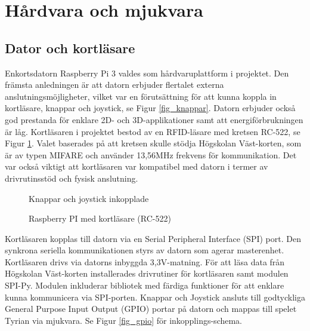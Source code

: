 \documentclass[12pt,fleqn,openany]{book} %
\begin{document}
\section{Hårdvara och mjukvara}
\subsection{Dator och kortläsare}
Enkortsdatorn Raspberry Pi 3 valdes som hårdvaruplattform i projektet. Den främsta anledningen är att datorn erbjuder flertalet
externa anslutningsmöjligheter, vilket var en förutsättning för att kunna koppla in kortläsare, knappar och joystick, se Figur \ref{fig_knappar}. Datorn 
erbjuder också god prestanda för enklare 2D- och 3D-applikationer samt att energiförbrukningen är låg. Kortläsaren i projektet 
bestod av en RFID-läsare med kretsen RC-522, se Figur \ref{fig_pirfid}. Valet baserades på att kretsen skulle stödja Högskolan Väst-korten, som är av typen 
MIFARE och använder 13,56MHz frekvens för kommunikation. Det var också viktigt att kortläsaren var kompatibel med datorn i termer 
av drivrutinsstöd och fysisk anslutning.

\begin{figure}[!htb]
  \begin{minipage}{0.44\textwidth}
    \centering
    \caption{Knappar och joystick inkopplade}
    \label{fig_knappar}
  \end{minipage}\hfill
  \begin{minipage}{0.44\textwidth}
    \centering
    \caption{Raspberry PI med kortläsare (RC-522)}
    \label{fig_pirfid}
  \end{minipage}\hfill 
\end{figure}

Kortläsaren kopplas till datorn via en Serial Peripheral Interface (SPI) port. Den synkrona seriella kommunikationen styrs av 
datorn som agerar masterenhet. Kortläsaren drivs via datorns inbyggda 3,3V-matning. För att läsa data från Högskolan Väst-korten 
installerades drivrutiner för kortläsaren samt modulen SPI-Py. Modulen inkluderar bibliotek med färdiga funktioner för att enklare 
kunna kommunicera via SPI-porten. Knappar och Joystick ansluts till godtyckliga General Purpose Input Output (GPIO) portar på datorn 
och mappas till spelet Tyrian via mjukvara. Se Figur \ref{fig_gpio} för inkopplings-schema.
\end{document}
